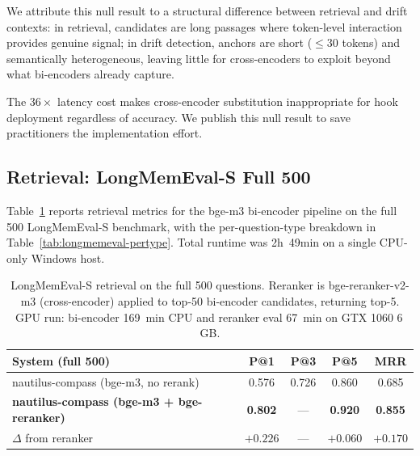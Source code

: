 We attribute this null result to a structural difference between
retrieval and drift contexts: in retrieval, candidates are
long passages where token-level interaction provides genuine
signal; in drift detection, anchors are short ($\leq 30$ tokens) and
semantically heterogeneous, leaving little for cross-encoders to
exploit beyond what bi-encoders already capture.

The $36\times$ latency cost makes cross-encoder substitution
inappropriate for hook deployment regardless of accuracy. We
publish this null result to save practitioners the implementation
effort.

\subsection{Retrieval: LongMemEval-S Full 500}
\label{sec:eval-retrieval}

Table~\ref{tab:longmemeval-full} reports retrieval metrics for the
bge-m3 bi-encoder pipeline on the full 500 LongMemEval-S benchmark,
with the per-question-type breakdown in
Table~\ref{tab:longmemeval-pertype}. Total runtime was 2h~49min
on a single CPU-only Windows host.

\begin{table}[h]
\centering
\caption{LongMemEval-S retrieval on the full 500 questions. Reranker
is bge-reranker-v2-m3 (cross-encoder) applied to top-50 bi-encoder
candidates, returning top-5. GPU run: bi-encoder 169~min CPU and
reranker eval 67~min on GTX 1060 6\,GB.}
\label{tab:longmemeval-full}
\begin{tabular}{lcccc}
\toprule
System (full 500) & P@1 & P@3 & P@5 & MRR \\
\midrule
nautilus-compass (bge-m3, no rerank)  & 0.576 & 0.726 & 0.860 & 0.685 \\
\textbf{nautilus-compass (bge-m3 + bge-reranker)} & \textbf{0.802} & --- & \textbf{0.920} & \textbf{0.855} \\
\midrule
$\Delta$ from reranker                & $+0.226$ & --- & $+0.060$ & $+0.170$ \\
\bottomrule
\end{tabular}
\end{table}

